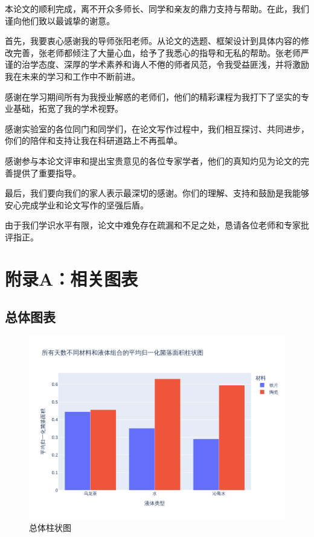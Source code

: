 \documentclass[12pt,a4paper]{ctexart}
\begin{document}
本论文的顺利完成，离不开众多师长、同学和亲友的鼎力支持与帮助。在此，我们谨向他们致以最诚挚的谢意。

首先，我要衷心感谢我的导师张阳老师。从论文的选题、框架设计到具体内容的修改完善，张老师都倾注了大量心血，给予了我悉心的指导和无私的帮助。张老师严谨的治学态度、深厚的学术素养和诲人不倦的师者风范，令我受益匪浅，并将激励我在未来的学习和工作中不断前进。

感谢在学习期间所有为我授业解惑的老师们，他们的精彩课程为我打下了坚实的专业基础，拓宽了我的学术视野。

感谢实验室的各位同门和同学们，在论文写作过程中，我们相互探讨、共同进步，你们的陪伴和支持让我在科研道路上不再孤单。

感谢参与本论文评审和提出宝贵意见的各位专家学者，他们的真知灼见为论文的完善提供了重要指导。

最后，我们要向我们的家人表示最深切的感谢。你们的理解、支持和鼓励是我能够安心完成学业和论文写作的坚强后盾。

由于我们学识水平有限，论文中难免存在疏漏和不足之处，恳请各位老师和专家批评指正。\newpage

\clearpage
\thispagestyle{empty} 
\section{附录A：相关图表}
\subsection{总体图表}
\begin{figure}[H]  %
    \centering  %
    \includegraphics[width=\textwidth]{./plot/General/bar_normalized_overall.png}  %
    \caption{总体柱状图}  %
    \label{fig:GeneralBar}  %
\end{figure}
\end{document}
